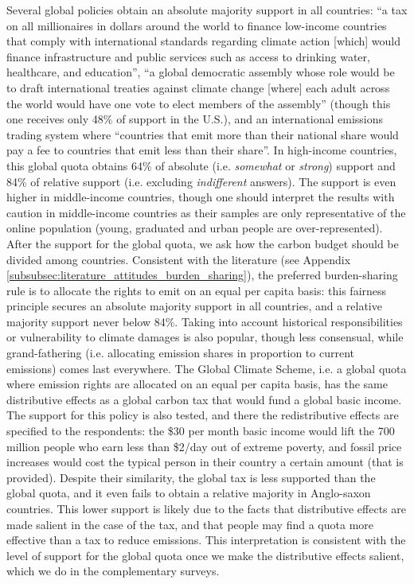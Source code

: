Several global policies obtain an absolute majority %
support in all countries: ``a tax on all millionaires in dollars around the world to finance low-income countries that comply with international standards regarding climate action [which] would finance infrastructure and public services such as access to drinking water, healthcare, and education'', %
``a global democratic assembly whose role would be to draft international treaties against climate change [where] each adult across the world would have one vote to elect members of the assembly'' (though this one receives only 48\% of support in the U.S.), %
and an international emissions trading system where ``countries that emit more than their national share would pay a fee to countries that emit less than their share''. 
In high-income countries, this global quota obtains 64\% of absolute (i.e. \textit{somewhat} or \textit{strong}) support and 84\% of relative support (i.e. excluding \textit{indifferent} answers). The support is even higher in middle-income countries, though one should interpret the results with caution in middle-income countries as their samples are only representative of the online population (young, graduated and urban people are over-represented). 
After the support for the global quota, we ask how the carbon budget should be divided among countries. 
Consistent with the literature (see Appendix \ref{subsubsec:literature_attitudes_burden_sharing}), the preferred burden-sharing rule is to allocate the rights to emit on an equal per capita basis: this fairness principle secures an absolute majority support in all countries, and a relative majority support never below 84\%. 
Taking into account historical responsibilities or vulnerability to climate damages is also popular, though less consensual, while grand-fathering (i.e. allocating emission shares in proportion to current emissions) comes last everywhere. 
The Global Climate Scheme, i.e. a global quota where emission rights are allocated on an equal per capita basis, has the same distributive effects as a global carbon tax that would fund a global basic income. The support for this policy is also tested, and there the redistributive effects are specified to the respondents: the \$30 per month basic income would lift the 700 million people who earn less than \$2/day out of extreme poverty, and fossil price increases would cost the typical person in their country a certain amount (that is provided).  %
Despite their similarity, the global tax is less supported than the global quota, and it even fails to obtain a relative majority in Anglo-saxon countries. This lower support is likely due to the facts that distributive effects are made salient in the case of the tax, and that people may find a quota more effective than a tax to reduce emissions. This interpretation is consistent with the level of support for the global quota once we make the distributive effects salient, which we do in the complementary surveys. %


